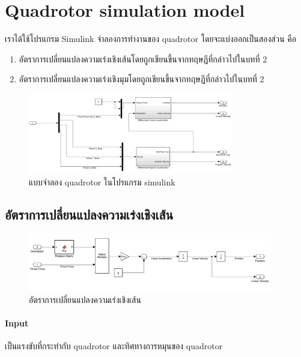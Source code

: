 \section{Quadrotor simulation model}
เราได้ใช้โปรแกรม Simulink จำลองการทำงานของ quadrotor โดยจะแบ่งออกเป็นสองส่วน คือ
\vspace{-10pt}
\begin{enumerate}[label=\arabic*), leftmargin=1.5cm]
	\setlength\itemsep{-0.25em}
	\item อัตราการเปลี่ยนแปลงความเร่งเชิงเส้นโดยถูกเขียนขึ้นจากทฤษฏีที่กล่าวไปในบทที่ 2
	\item อัตราการเปลี่ยนแปลงความเร่งเชิงมุมโดยถูกเขียนขึ้นจากทฤษฏีที่กล่าวไปในบทที่ 2
\end{enumerate}
\vspace{-15pt}
\begin{figure}[!ht]
	\centering
	\includegraphics[width=0.8\textwidth]{images/simulink/sim_dynamic_all.png}
	\caption{แบบจำลอง quadrotor ในโปรแกรม simulink}
\end{figure}

\subsection{อัตราการเปลี่ยนแปลงความเร่งเชิงเส้น}
\begin{figure}[!ht]
	\centering
	\includegraphics[width=0.95\textwidth]{images/simulink/linear_acce.png}
	\caption{อัตราการเปลี่ยนแปลงความเร่งเชิงเส้น}
\end{figure}
\vspace{-10pt}
\paragraph*{Input}
เป็นแรงขับที่กระทำกับ quadrotor และทิศทางการหมุนของ quadrotor
